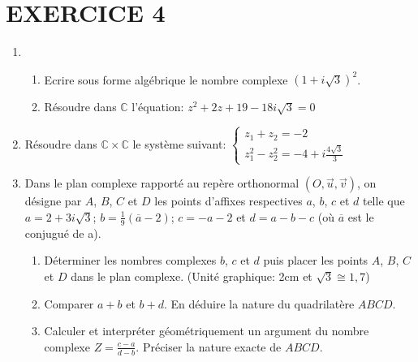 \documentclass[12pts]{book}
\begin{document}
	\section*{EXERCICE 4}
		\begin{enumerate}
			\item 
				\begin{enumerate}
					\item Ecrire sous forme algébrique le nombre complexe $(1+i\sqrt{3})^2$.
					\item Résoudre dans $\mathbb{C}$ l'équation: $z^2+2z+19-18i\sqrt{3}=0$
				\end{enumerate}
			\item Résoudre dans $\mathbb{C} \times \mathbb{C}$ le système suivant:
				$\left\{ \begin{array}{l}
					z_1 + z_2 =-2 \\
					z_1^2-z_2^2=-4+i\frac{4\sqrt{3}}{3}
				\end{array} \right.$
				\item Dans le plan complexe rapporté au repère orthonormal $(O,\overrightarrow{u}, \overrightarrow{v})$, on désigne par $A$, $B$, $C$ et $D$ les points d'affixes respectives $a$, $b$, $c$ et $d$ telle que $a=2+3i\sqrt{3}$; $b=\frac{1}{9}(\overline{a} - 2)$; $c=-a-2$  et $d= a-b-c$ (où $\overline{a}$ est le conjugué de a).
			\begin{enumerate}
				\item Déterminer les nombres complexes $b$, $c$ et $d$ puis placer les points $A$, $B$, $C$ et $D$ dans le plan complexe. (Unité graphique: 2cm et $\sqrt{3}\cong 1,7$)
				\item Comparer $a+b$ et $b+d$. En déduire la nature du quadrilatère $ABCD$.
				\item Calculer et interpréter géométriquement un argument du nombre complexe $Z=\frac{c-a}{d-b}$. Préciser la nature exacte de $ABCD$.
			\end{enumerate}
		\end{enumerate}
	
\end{document}
